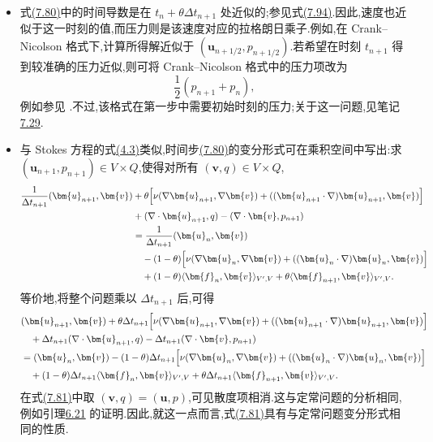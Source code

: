 \begin{note}[关于不可压缩约束]
\label{note:theta-scheme-incompressibility}
\begin{itemize}
  \item 式\hyperref[eq:theta-scheme-one-step]{(7.80)}中的时间导数是在 $t_n+\theta\Delta t_{n+1}$ 处近似的;参见式\hyperref[eq:midpoint-difference-consistency]{(7.94)}.因此,速度也近似于这一时刻的值,而压力则是该速度对应的拉格朗日乘子.例如,在 Crank--Nicolson 格式下,计算所得解近似于 $(\bm{u}_{n+1/2},p_{n+1/2})$.若希望在时刻 $t_{n+1}$ 得到较准确的压力近似,则可将 Crank--Nicolson 格式中的压力项改为
  \[
    \frac12(p_{n+1}+p_n),
  \]
  例如参见 \textcite{Rang2008}.不过,该格式在第一步中需要初始时刻的压力;关于这一问题,见笔记\hyperref[note:time-dependent-initial-pressure]{7.29}.

  \item 与 Stokes 方程的式\hyperref[eq:stokes-abstract-weak]{(4.3)}类似,时间步\hyperref[eq:theta-scheme-one-step]{(7.80)}的变分形式可在乘积空间中写出:求 $(\bm{u}_{n+1},p_{n+1})\in V\times Q$,使得对所有 $(\bm{v},q)\in V\times Q$,
  \[
  \begin{aligned}
    \frac{1}{\Delta t_{n+1}}(\bm{u}_{n+1},\bm{v})
    &+\theta\Bigl[\nu(\nabla\bm{u}_{n+1},\nabla\bm{v})
       +((\bm{u}_{n+1}\cdot\nabla)\bm{u}_{n+1},\bm{v})\Bigr]\\
    &+(\nabla\cdot\bm{u}_{n+1},q)
       -(\nabla\cdot\bm{v},p_{n+1})\\
    &=\frac{1}{\Delta t_{n+1}}(\bm{u}_n,\bm{v})\\
    &\quad-(1-\theta)\Bigl[\nu(\nabla\bm{u}_n,\nabla\bm{v})
       +((\bm{u}_n\cdot\nabla)\bm{u}_n,\bm{v})\Bigr]\\
    &\quad+(1-\theta)\langle\bm{f}_n,\bm{v}\rangle_{V',V}
       +\theta\langle\bm{f}_{n+1},\bm{v}\rangle_{V',V}.
  \end{aligned}
  \]
  等价地,将整个问题乘以 $\Delta t_{n+1}$ 后,可得
  \begin{equation}\label{eq:theta-scheme-variational}
  \begin{aligned}
    &(\bm{u}_{n+1},\bm{v})
      +\theta\Delta t_{n+1}\Bigl[\nu(\nabla\bm{u}_{n+1},\nabla\bm{v})
       +((\bm{u}_{n+1}\cdot\nabla)\bm{u}_{n+1},\bm{v})\Bigr]\\
    &\quad+\Delta t_{n+1}(\nabla\cdot\bm{u}_{n+1},q)
       -\Delta t_{n+1}(\nabla\cdot\bm{v},p_{n+1})\\
    &=(\bm{u}_n,\bm{v})
       -(1-\theta)\Delta t_{n+1}\Bigl[\nu(\nabla\bm{u}_n,\nabla\bm{v})
       +((\bm{u}_n\cdot\nabla)\bm{u}_n,\bm{v})\Bigr]\\
    &\quad+(1-\theta)\Delta t_{n+1}\langle\bm{f}_n,\bm{v}\rangle_{V',V}
       +\theta\Delta t_{n+1}\langle\bm{f}_{n+1},\bm{v}\rangle_{V',V}.
  \end{aligned}
  \end{equation}
  在式\hyperref[eq:theta-scheme-variational]{(7.81)}中取 $(\bm{v},q)=(\bm{u},p)$,可见散度项相消.这与定常问题的分析相同,例如引理\hyperref[lem:steady-ns-stability]{6.21} 的证明.因此,就这一点而言,式\hyperref[eq:theta-scheme-variational]{(7.81)}具有与定常问题变分形式相同的性质.


\end{itemize}
\end{note}
